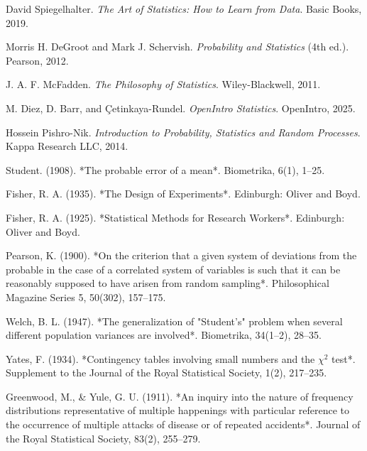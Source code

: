 \documentclass{book}
\begin{document}
\begin{thebibliography}{999}

David Spiegelhalter. 
\textit{The Art of Statistics: How to Learn from Data}. 
Basic Books, 2019.

Morris H. DeGroot and Mark J. Schervish.
\textit{Probability and Statistics} (4th ed.).
Pearson, 2012.

J. A. F. McFadden.
\textit{The Philosophy of Statistics}.
Wiley-Blackwell, 2011.

M. Diez, D. Barr, and Çetinkaya-Rundel.
\textit{OpenIntro Statistics}.
OpenIntro, 2025.

Hossein Pishro-Nik.
\textit{Introduction to Probability, Statistics and Random Processes}.
Kappa Research LLC, 2014.

Student. (1908). *The probable error of a mean*. Biometrika, 6(1), 1–25.

Fisher, R. A. (1935). *The Design of Experiments*. Edinburgh: Oliver and Boyd.

Fisher, R. A. (1925). *Statistical Methods for Research Workers*. Edinburgh: Oliver and Boyd.

Pearson, K. (1900). *On the criterion that a given system of deviations from the probable in the case of a correlated system of variables is such that it can be reasonably supposed to have arisen from random sampling*. Philosophical Magazine Series 5, 50(302), 157–175.

Welch, B. L. (1947). *The generalization of "Student’s" problem when several different population variances are involved*. Biometrika, 34(1–2), 28–35.

Yates, F. (1934). *Contingency tables involving small numbers and the $\chi^2$ test*. Supplement to the Journal of the Royal Statistical Society, 1(2), 217–235.

Greenwood, M., \& Yule, G. U. (1911). *An inquiry into the nature of frequency distributions representative of multiple happenings with particular reference to the occurrence of multiple attacks of disease or of repeated accidents*. Journal of the Royal Statistical Society, 83(2), 255–279.

\end{thebibliography}
\end{document}

